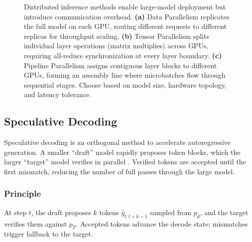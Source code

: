 \begin{figure}[t]
\begin{llmfigbox}
\end{llmfigbox}
\caption{Distributed inference methods enable large-model deployment but introduce communication overhead. \textbf{(a)} Data Parallelism replicates the full model on each GPU, routing different requests to different replicas for throughput scaling. \textbf{(b)} Tensor Parallelism splits individual layer operations (matrix multiplies) across GPUs, requiring all-reduce synchronization at every layer boundary. \textbf{(c)} Pipeline Parallelism assigns contiguous layer blocks to different GPUs, forming an assembly line where microbatches flow through sequential stages. Choose based on model size, hardware topology, and latency tolerance.}
\label{fig:ch06_parallelism}
\end{figure}

\subsection{Speculative Decoding}
\label{sec:scaling-speculative-decoding}
Speculative decoding is an orthogonal method to accelerate autoregressive generation. A smaller ``draft'' model rapidly proposes token blocks, which the larger ``target'' model verifies in parallel \cite{google2022_chip}. Verified tokens are accepted until the first mismatch, reducing the number of full passes through the large model.

\subsubsection{Principle} At step $t$, the draft proposes $k$ tokens $\hat{y}_{t:t+k-1}$ sampled from $p_d$, and the target verifies them against $p_T$. Accepted tokens advance the decode state; mismatches trigger fallback to the target.

